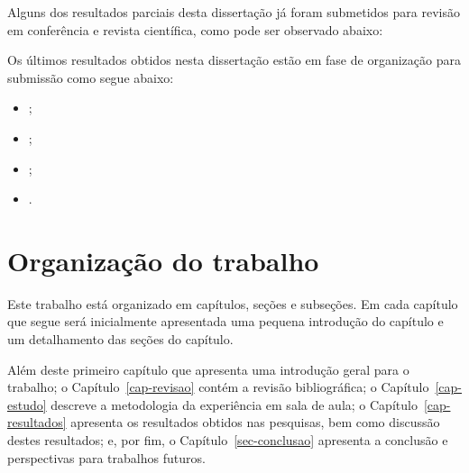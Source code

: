 Alguns dos resultados parciais desta dissertação já
foram submetidos para revisão em conferência e revista
científica, como pode ser observado abaixo:
\begin{itemize}

\end{itemize}

Os últimos resultados obtidos nesta dissertação estão
em fase de organização para submissão como segue abaixo:

\begin{itemize}
\item{;}
\item{;}
\item{;}
\item{.}
\end{itemize}

\section{Organização do trabalho}
Este trabalho está organizado em capítulos, seções e subseções.
Em cada capítulo que segue será inicialmente
apresentada uma pequena introdução do capítulo e um detalhamento
das seções do capítulo.

Além deste primeiro capítulo que apresenta uma introdução geral
para o trabalho;
o Capítulo~\ref{cap-revisao} contém a revisão bibliográfica;
o Capítulo~\ref{cap-estudo} descreve a metodologia da experiência em sala de aula;
o Capítulo~\ref{cap-resultados} apresenta os resultados obtidos nas pesquisas, bem
como discussão destes resultados;
e, por fim, o Capítulo~\ref{sec-conclusao} apresenta a conclusão e perspectivas
para trabalhos futuros.
